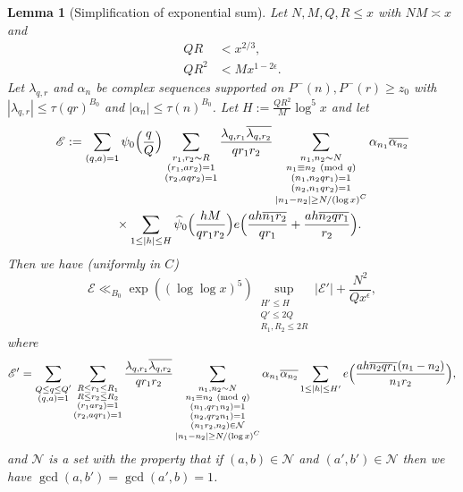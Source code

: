 \documentclass[10pt]{amsart}
\theoremstyle{plain}
\newtheorem{lmm}[thrm]{Lemma}
\numberwithin{equation}{section}
\newcommand{\Mod}[1]{\ (\mathrm{mod}\ #1)}
\renewcommand{\hat}[1]{\widehat #1}
\begin{document}
\begin{lmm}[Simplification of exponential sum]\label{lmm:Simplification}
Let $N,M,Q,R \le x$ with $NM\asymp x$ and 
\begin{align}
Q R&<x^{2/3},\label{eq:CrudeSize}\\
Q R^2&< M x^{1-2\epsilon}.\label{eq:CrudeSize2}
\end{align}
Let $\lambda_{q,r}$ and $\alpha_n$ be complex sequences supported on $P^-(n),P^-(r)\ge z_0$ with $|\lambda_{q,r}|\le \tau(qr)^{B_0}$ and $|\alpha_n|\le \tau(n)^{B_0}$. Let $H:=\frac{Q R^2}{M}\log^5{x}$ and let
\begin{align*}
\mathscr{E}&:=\sum_{\substack{ (q,a)=1}}\psi_0\Bigl(\frac{q}{Q}\Bigr)\sum_{\substack{r_1,r_2\sim R\\ (r_1,a r_2)=1\\ (r_2,a q r_2)=1}}\frac{\lambda_{q,r_1}\overline{\lambda_{q,r_2}}}{q r_1 r_2}\sum_{\substack{n_1,n_2\sim N\\ n_1\equiv n_2\Mod{q}\\ (n_1,n_2qr_1)=1\\(n_2,n_1qr_2)=1\\ |n_1-n_2|\ge N/(\log{x})^C}}\alpha_{n_1}\overline{\alpha_{n_2}}\\
&\qquad\qquad \times\sum_{1\le |h|\le H}\hat{\psi}_0\Bigl(\frac{h M}{q r_1 r_2}\Bigr)e\Bigl(\frac{ah\overline{n_1 r_2}}{q r_1}+\frac{ah\overline{n_2 q r_1}}{r_2}\Bigr).
\end{align*}
Then we have (uniformly in $C$)
\[
\mathscr{E}\ll_{B_0}\exp((\log\log{x})^5)\sup_{\substack{H'\le H\\ Q'\le 2Q\\ R_1,R_2\le 2R}}|\mathscr{E}'|+\frac{N^2}{Qx^\epsilon},
\]
where
\[
\mathscr{E}'=\sum_{\substack{Q\le q\le Q'\\ (q,a)=1}}\sum_{\substack{R\le r_1\le  R_1\\ R\le r_2\le R_2\\ (r_1a r_2)=1\\ (r_2,a q r_1)=1}}\frac{\lambda_{q,r_1}\overline{\lambda_{q,r_2}}}{q r_1 r_2}\sum_{\substack{n_1,n_2\sim N\\ n_1\equiv n_2\Mod{q}\\ (n_1,qr_1n_2)=1\\ (n_2,qr_2n_1)=1\\ (n_1r_2,n_2)\in\mathcal{N}\\ |n_1-n_2|\ge N/(\log{x})^C}}\alpha_{n_1}\overline{\alpha_{n_2}}\sum_{1\le |h| \le H'} e\Bigl(\frac{ ah\overline{n_2 q r_1}(n_1-n_2)}{n_1 r_2}\Bigr),
\]
and $\mathcal{N}$ is a set with the property that if $(a,b)\in\mathcal{N}$ and $(a',b')\in\mathcal{N}$ then we have $\gcd(a,b')=\gcd(a',b)=1$.
\end{lmm}
\end{document}
